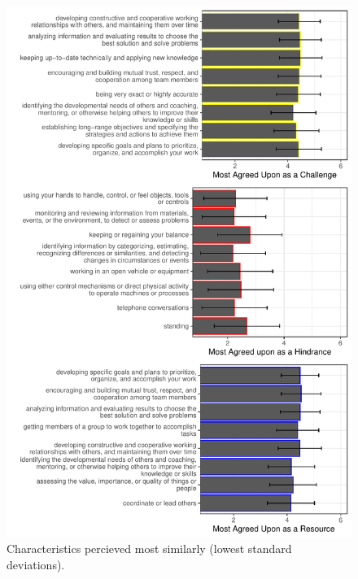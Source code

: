 \documentclass[
  english,
  man]{apa6}
\begin{document}
\begin{figure}
\centering
\includegraphics{Submission_files/figure-latex/combinegraphs-1.pdf}
\caption{\label{fig:combinegraphs}Characteristics percieved most similarly (lowest standard deviations).}
\end{figure}
\end{document}
